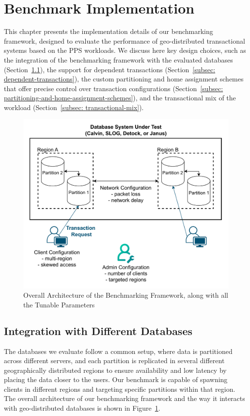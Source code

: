 \section{Benchmark Implementation}
\label{sec: benchmark-implementation}
This chapter presents the implementation details of our benchmarking framework, designed to evaluate the performance of geo-distributed transactional systems based on the PPS workloads. We discuss here key design choices, such as the integration of the benchmarking framework with the evaluated databases (Section~\ref{subsec: integration-with-different-databases}), the support for dependent transactions (Section~\ref{subsec: dependent-transactions}), the custom partitioning and home assignment schemes that offer precise control over transaction configurations (Section~\ref{subsec: partitioning-and-home-assignment-schemes}), and the transactional mix of the workload (Section~\ref{subsec: transactional-mix}).

\begin{figure}[ht]
    \centering
    \includegraphics[width=1\linewidth]{figures/Overall Architecture.pdf}
    \caption{Overall Architecture of the Benchmarking Framework, along with all the Tunable Parameters}
    \label{fig: overall-architecture}
\end{figure}

\subsection{Integration with Different Databases}
\label{subsec: integration-with-different-databases}
The databases we evaluate follow a common setup, where data is partitioned across different servers, and each partition is replicated in several different geographically distributed regions to ensure availability and low latency by placing the data closer to the users. Our benchmark is capable of spawning clients in different regions and targeting specific partitions within that region. The overall architecture of our benchmarking framework and the way it interacts with geo-distributed databases is shown in Figure~\ref{fig: overall-architecture}.

